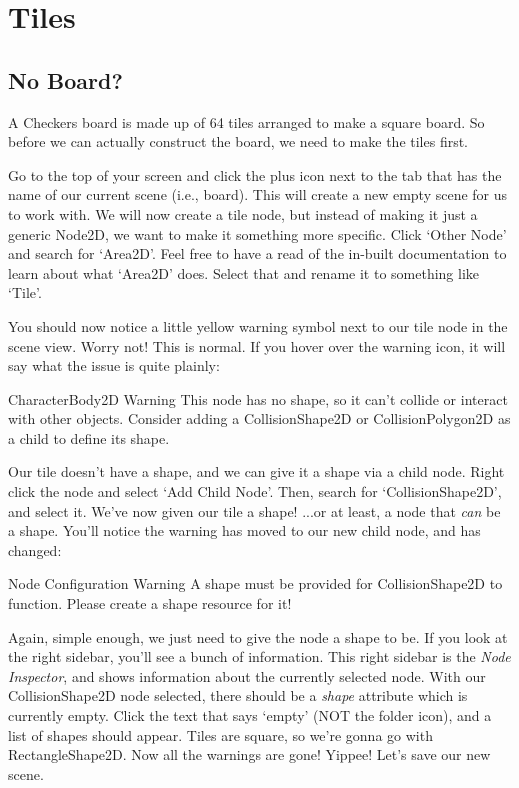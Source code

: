 \documentclass[14pt]{extarticle}
\begin{document}
\newpage

\section{Tiles}
\subsection*{No Board?}
A Checkers board is made up of 64 tiles arranged to make a square board. So before we can actually construct the board, we need to make the tiles first.

Go to the top of your screen and click the plus icon next to the tab that has the name of our current scene (i.e., board). This will create a new empty scene for us to work with. We will now create a tile node, but instead of making it just a generic Node2D, we want to make it something more specific. Click `Other Node' and search for `Area2D'. Feel free to have a read of the in-built documentation to learn about what `Area2D' does. Select that and rename it to something like `Tile'.

You should now notice a little yellow warning symbol next to our tile node in the scene view. Worry not! This is normal. If you hover over the warning icon, it will say what the issue is quite plainly:

\begin{callout-warning}{CharacterBody2D Warning}
This node has no shape, so it can't collide or interact with other objects. Consider adding a CollisionShape2D or CollisionPolygon2D as a child to define its shape.
\end{callout-warning}

Our tile doesn't have a shape, and we can give it a shape via a child node. Right click the node and select `Add Child Node'. Then, search for `CollisionShape2D', and select it. We've now given our tile a shape! ...or at least, a node that \textit{can} be a shape. You'll notice the warning has moved to our new child node, and has changed:

\begin{callout-warning}{Node Configuration Warning}
A shape must be provided for CollisionShape2D to function. Please create a shape resource for it!
\end{callout-warning}

Again, simple enough, we just need to give the node a shape to be. If you look at the right sidebar, you'll see a bunch of information. This right sidebar is the \textit{Node Inspector}, and shows information about the currently selected node. With our CollisionShape2D node selected, there should be a \textit{shape} attribute which is currently empty. Click the text that says `empty' (NOT the folder icon), and a list of shapes should appear. Tiles are square, so we're gonna go with RectangleShape2D. Now all the warnings are gone! Yippee! Let's save our new scene.
\end{document}
